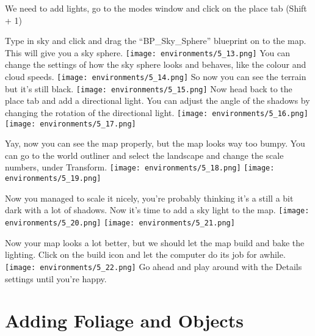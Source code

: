 \documentclass[../main.tex]{subfiles}
\begin{document}
We need to add lights, go to the modes window and click on the place tab (Shift + 1)

Type in sky and click and drag the “BP_Sky_Sphere” blueprint on to the map. This will give you a sky sphere.
\texttt{[image: environments/5\_13.png]}
You can change the settings of how the sky sphere looks and behaves, like the colour and cloud speeds.
\texttt{[image: environments/5\_14.png]}
So now you can see the terrain but it’s still black.
\texttt{[image: environments/5\_15.png]}
Now head back to the place tab and add a directional light. You can adjust the angle of the shadows by changing the rotation of the directional light.
\texttt{[image: environments/5\_16.png]}
\texttt{[image: environments/5\_17.png]}

Yay, now you can see the map properly, but the map looks way too bumpy. You can go to the world outliner and select the landscape and change the scale numbers, under Transform.
\texttt{[image: environments/5\_18.png]}
\texttt{[image: environments/5\_19.png]}

Now you managed to scale it nicely, you’re probably thinking it’s a still a bit dark with a lot of shadows. Now it’s time to add a sky light to the map.
\texttt{[image: environments/5\_20.png]}
\texttt{[image: environments/5\_21.png]}

Now your map looks a lot better, but we should let the map build and bake the lighting.
Click on the build icon and let the computer do its job for awhile.
\texttt{[image: environments/5\_22.png]}
Go ahead and play around with the Details settings until you’re happy.

\section {Adding Foliage and Objects}
\end{document}
